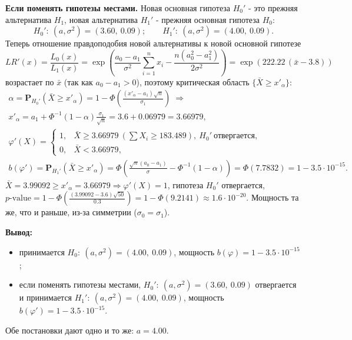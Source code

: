 \documentclass[12pt]{spbstu-task}
\renewcommand{\Prob}{\mathbf{P}}
\begin{document}
\textbf{Если поменять гипотезы местами.} Новая основная гипотеза \(H_0'\) - это прежняя альтернатива \(H_1\),
новая альтернатива \(H_1'\) - прежняя основная гипотеза \(H_0\):
\begin{displaymath}
  H_0':\ (a, \sigma^2) = (3.60,\ 0.09);\qquad H_1':\ (a, \sigma^2) = (4.00,\ 0.09).
\end{displaymath}
Теперь отношение правдоподобия новой альтернативы к новой основной гипотезе
\begin{displaymath}
  LR'(x) = \frac{L_0(x)}{L_1(x)} = \exp\left(\frac{a_0 - a_1}{\sigma^2}\sum_{i=1}^{n}x_i - \frac{n\left(a_0^2 - a_1^2\right)}{2\sigma^2}\right)
  = \exp\left(222.22\,(\bar{x} - 3.8)\right)
\end{displaymath}
возрастает по \(\bar{x}\) (так как \(a_0 - a_1 > 0\)), поэтому критическая область \(\{\bar{X} \ge x'_\alpha\}\):
\begin{gather*}
  \alpha = \Prob_{H_0'}\left(\bar{X} \ge x'_\alpha\right) = 1 - \Phi\left(\frac{(x'_\alpha - a_1)\sqrt{n}}{\sigma_1}\right)
  \;\Rightarrow\\
  x'_\alpha = a_1 + \Phi^{-1}(1 - \alpha)\frac{\sigma_1}{\sqrt{n}} = 3.6 + 0.06979 = 3.66979,\\
  \varphi'(X) =
  \begin{cases}
    1, & \bar{X} \ge 3.66979\ \left(\sum X_i \ge 183.489\right),\ H_0'\ \text{отвергается},\\
    0, & \bar{X} < 3.66979,
  \end{cases}\\
  b(\varphi') = \Prob_{H_1'}\left(\bar{X} \ge x'_\alpha\right) = \Phi\left(\frac{\sqrt{n}(a_0 - a_1)}{\sigma} - \Phi^{-1}(1 - \alpha)\right)
  = \Phi(7.7832) = 1 - 3.5\cdot 10^{-15}.
\end{gather*}
\(\bar{X} = 3.99092 \ge x'_\alpha = 3.66979 \Rightarrow \varphi'(X) = 1\), гипотеза \(H_0'\) отвергается,
\(p\text{-value} = 1 - \Phi\left(\frac{(3.99092 - 3.6)\sqrt{50}}{0.3}\right) = 1 - \Phi(9.2141) \approx 1.6\cdot 10^{-20}\).
Мощность та же, что и раньше, из-за симметрии (\(\sigma_0 = \sigma_1\)).

\noindent\textbf{Вывод:}
\begin{itemize}[label=\textbullet]
  \item принимается \(H_0:\ (a, \sigma^2) = (4.00,\ 0.09)\), мощность \(b(\varphi) = 1 - 3.5\cdot 10^{-15}\);
  \item если поменять гипотезы местами, \(H_0':\ (a, \sigma^2) = (3.60,\ 0.09)\) отвергается
    и принимается \(H_1':\ (a, \sigma^2) = (4.00,\ 0.09)\), мощность \(b(\varphi') = 1 - 3.5\cdot 10^{-15}\).
\end{itemize}
Обе постановки дают одно и то же: \(a = 4.00\).
\end{document}
